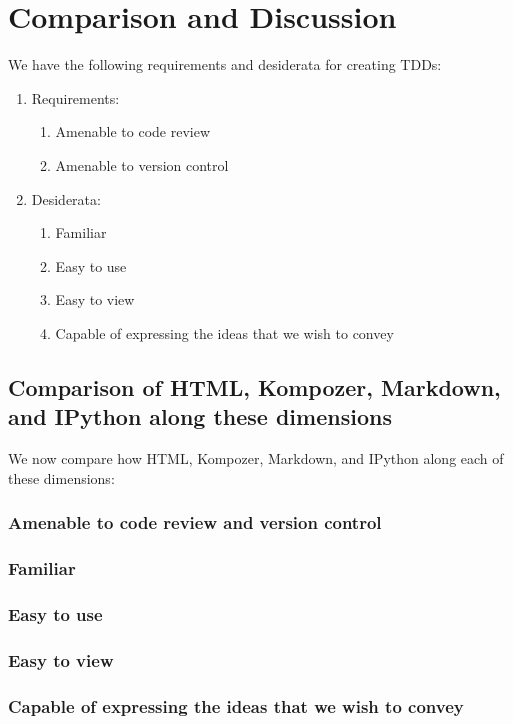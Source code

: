 \documentclass[]{article}
\begin{document}
		


\section{Comparison and Discussion}
We have the following requirements and desiderata for creating TDDs:

\begin{enumerate}
	\item Requirements:
		\begin{enumerate}
			\item Amenable to code review
			\item Amenable to version control
		\end{enumerate}
	\item Desiderata:
		\begin{enumerate}
			\item Familiar
			\item Easy to use
			\item Easy to view
			\item Capable of expressing the ideas that we wish to convey			
		\end{enumerate}
\end{enumerate}

\subsection{Comparison of HTML, Kompozer, Markdown, and IPython along these dimensions}

We now compare how HTML, Kompozer, Markdown, and IPython along each of these dimensions:

	\subsubsection{Amenable to code review and version control}
	
		
	
	\subsubsection{Familiar}
	
	\subsubsection{Easy to use}
	
	\subsubsection{Easy to view}
	
	\subsubsection{Capable of expressing the ideas that we wish to convey}
\end{document}
